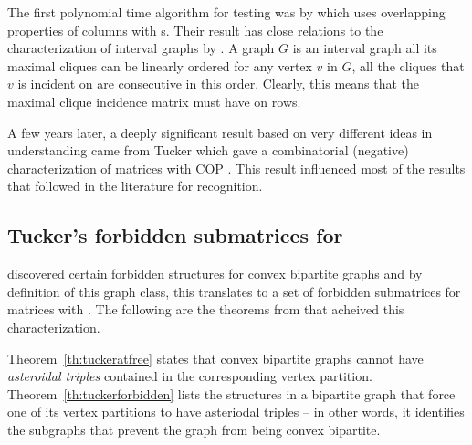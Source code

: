 The first polynomial time algorithm for \COP testing was by
\cite{fg65} which uses overlapping properties of columns with \un
s. Their result has close relations to the characterization of
interval graphs by \cite{gh64}. A graph $G$ is an interval graph \iff
all its maximal cliques can be linearly ordered \stt for any vertex
$v$ in $G$, all the cliques that $v$ is incident on are consecutive in
this order. Clearly, this means that the maximal clique incidence
matrix must
have \COP on rows.

A few years later, a deeply significant result based on very
different ideas in understanding \COP came from Tucker which gave a
combinatorial (negative) characterization of matrices with COP
\cite{at72}. This result influenced most of the \COP results that
followed in the literature  for \COP recognition.


\subsection{Tucker's forbidden submatrices for \COP}


\cite{at72} discovered certain forbidden structures for convex
bipartite graphs and by definition of this graph
class, this translates to a set of forbidden submatrices for matrices
with \cop.  The following are the theorems from \cite{at72} that
acheived this characterization.


Theorem~\ref{th:tuckeratfree} states that convex bipartite graphs
cannot have {\em asteroidal triples} contained in the corresponding vertex
partition.
Theorem~\ref{th:tuckerforbidden} lists the structures in a
bipartite graph that force one of its vertex partitions to have
asteriodal triples -- in other words, it identifies the subgraphs that
prevent the graph from being convex bipartite.


